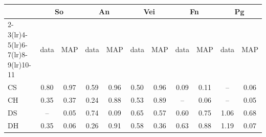 \begin{tabular}{lcccccccccc}
\toprule
 & \multicolumn{2}{c}{So} & \multicolumn{2}{c}{An} & \multicolumn{2}{c}{Vei} & \multicolumn{2}{c}{Fn} & \multicolumn{2}{c}{Pg} \\
\cmidrule(lr){2-3}\cmidrule(lr){4-5}\cmidrule(lr){6-7}\cmidrule(lr){8-9}\cmidrule(lr){10-11}
 & data & MAP & data & MAP & data & MAP & data & MAP & data & MAP \\
\midrule
CS & 0.80 & 0.97 & 0.59 & 0.96 & 0.50 & 0.96 & 0.09 & 0.11 & -- & 0.06 \\
CH & 0.35 & 0.37 & 0.24 & 0.88 & 0.53 & 0.89 & -- & 0.06 & -- & 0.05 \\
DS & -- & 0.05 & 0.74 & 0.09 & 0.65 & 0.57 & 0.60 & 0.75 & 1.06 & 0.68 \\
DH & 0.35 & 0.06 & 0.26 & 0.91 & 0.58 & 0.36 & 0.63 & 0.88 & 1.19 & 0.07 \\
\bottomrule
\end{tabular}
